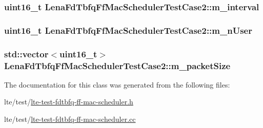 \subsubsection[{\texorpdfstring{m\+\_\+interval}{m_interval}}]{\setlength{\rightskip}{0pt plus 5cm}uint16\+\_\+t Lena\+Fd\+Tbfq\+Ff\+Mac\+Scheduler\+Test\+Case2\+::m\+\_\+interval\hspace{0.3cm}{\ttfamily [private]}}\hypertarget{classLenaFdTbfqFfMacSchedulerTestCase2_a2f29ab8ea196fc6909becc1f291eb129}{}\label{classLenaFdTbfqFfMacSchedulerTestCase2_a2f29ab8ea196fc6909becc1f291eb129}
\subsubsection[{\texorpdfstring{m\+\_\+n\+User}{m_nUser}}]{\setlength{\rightskip}{0pt plus 5cm}uint16\+\_\+t Lena\+Fd\+Tbfq\+Ff\+Mac\+Scheduler\+Test\+Case2\+::m\+\_\+n\+User\hspace{0.3cm}{\ttfamily [private]}}\hypertarget{classLenaFdTbfqFfMacSchedulerTestCase2_a7958cd8dfbb944caea78b5208a737625}{}\label{classLenaFdTbfqFfMacSchedulerTestCase2_a7958cd8dfbb944caea78b5208a737625}
\subsubsection[{\texorpdfstring{m\+\_\+packet\+Size}{m_packetSize}}]{\setlength{\rightskip}{0pt plus 5cm}std\+::vector$<$uint16\+\_\+t$>$ Lena\+Fd\+Tbfq\+Ff\+Mac\+Scheduler\+Test\+Case2\+::m\+\_\+packet\+Size\hspace{0.3cm}{\ttfamily [private]}}\hypertarget{classLenaFdTbfqFfMacSchedulerTestCase2_ad5516b67243721378cbc5af405181602}{}\label{classLenaFdTbfqFfMacSchedulerTestCase2_ad5516b67243721378cbc5af405181602}


The documentation for this class was generated from the following files\+:\begin{DoxyCompactItemize}
\item 
lte/test/\hyperlink{lte-test-fdtbfq-ff-mac-scheduler_8h}{lte-\/test-\/fdtbfq-\/ff-\/mac-\/scheduler.\+h}\item 
lte/test/\hyperlink{lte-test-fdtbfq-ff-mac-scheduler_8cc}{lte-\/test-\/fdtbfq-\/ff-\/mac-\/scheduler.\+cc}\end{DoxyCompactItemize}
